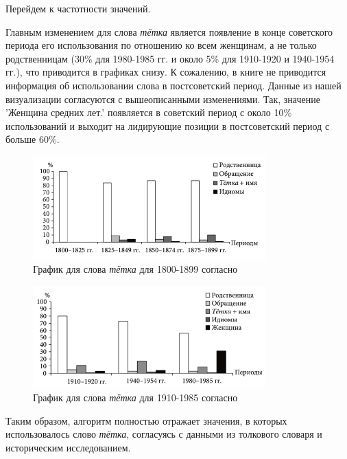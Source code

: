 Перейдем к частотности значений.

Главным изменением для слова \textit{тётка} является появление в конце советского периода
его использования по отношению ко всем женщинам, а не только родственницам (30\% для 1980-1985 гг.
и около 5\% для 1910-1920 и 1940-1954 гг.), что приводится в графиках снизу.
К сожалению, в книге не приводится информация об использовании слова в постсоветский период.
Данные из нашей визуализации согласуются с вышеописанными изменениями.
Так, значение ’Женщина средних лет.’ появляется в советский период с около 10\%
использований и выходит на лидирующие позиции в постсоветский период с больше 60\%.

\noindent %
\begin{figure}[H]
    \centering %
    \includegraphics[width=0.8\textwidth]{img/book/tetka/1800-1899}
    \caption{График для слова \textit{тётка} для 1800-1899 согласно~\cite{TwoCenturies}}
\end{figure}

\begin{figure}[H]
    \centering %
    \includegraphics[width=0.8\textwidth]{img/book/tetka/1910-1985}
    \caption{График для слова \textit{тётка} для 1910-1985 согласно~\cite{TwoCenturies}}
\end{figure}

Таким образом, алгоритм полностью отражает значения, в которых использовалось
слово \textit{тётка}, согласуясь с данными из толкового словаря и историческим исследованием.

